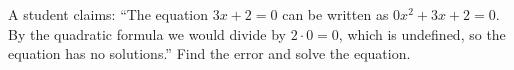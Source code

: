 A student claims: ``The equation $3x+2=0$ can be written as $0x^2+3x+2=0$. By the quadratic formula we would divide by $2\cdot0=0$, which is undefined, so the equation has no solutions.'' Find the error and solve the equation.
